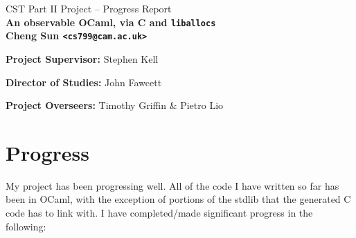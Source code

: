 \documentclass[12pt,twoside,a4paper]{article}
\begin{document}
\begin{center}
\Large CST Part II Project -- Progress Report
\\[4mm]
\LARGE \bfseries An observable OCaml, via C and \lstinline{liballocs} \mdseries
\\[4mm]

\large
Cheng Sun \lstinline{<cs799@cam.ac.uk>}

\makeatletter
\@date
\makeatother

\end{center}

\vspace{5mm}

\textbf{Project Supervisor:} Stephen Kell

\textbf{Director of Studies:} John Fawcett

\textbf{Project Overseers:} Timothy Griffin \& Pietro Lio


\section*{Progress}

My project has been progressing well. All of the code I have written so far has been in OCaml, with the exception of portions of the stdlib that the generated C code has to link with. I have completed/made significant progress in the following:
\end{document}
